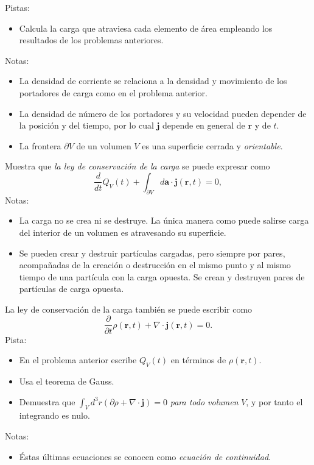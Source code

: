 \documentclass{exam}
\begin{document}
\begin{questions}
    Pistas:
    \begin{itemize}
    \item Calcula la carga que atraviesa cada elemento de área
      empleando los resultados de los problemas anteriores.
    \end{itemize}
    Notas:
    \begin{itemize}
    \item La densidad de corriente se relaciona a la densidad y
      movimiento de los portadores de carga como en el problema
      anterior.
    \item La densidad de número de los portadores y su velocidad pueden
      depender de la posición y del tiempo, por lo cual $\bm j$
      depende en general de $\bm r$ y de $t$.
    \item La frontera $\partial V$ de un volumen $V$ es una superficie
      cerrada y {\em orientable}.
    \end{itemize}
  \question Muestra que {\em la ley de conservación de la carga} se
    puede expresar como
    $$
    \frac{d}{dt}Q_V(t)+\int_{\partial V}d\bm a\cdot\bm j(\bm r,t)=0,
    $$
    Notas:
    \begin{itemize}
    \item La carga no se crea ni se destruye. La única manera como
      puede salirse carga del interior de un volumen es atravesando su
      superficie.
    \item Se pueden crear y destruir partículas cargadas, pero siempre
      por pares, acompañadas de la creación o destrucción en el mismo
      punto y al mismo tiempo de una partícula con la carga
      opuesta. Se crean y destruyen pares de partículas de carga
      opuesta.
    \end{itemize}
  \question La ley de conservación de la carga también se puede
    escribir como
    $$ \frac{\partial}{\partial t}\rho(\bm r,t)+\nabla\cdot\bm j(\bm
    r,t)=0.$$
    Pista:
    \begin{itemize}
    \item En el problema anterior escribe $Q_V(t)$ en términos de
      $\rho(\bm r,t)$.
    \item Usa el teorema de Gauss.
    \item Demuestra que $\int_Vd^3r(\partial\rho+\nabla\cdot\bm j)=0$
      {\em para todo volumen} $V$, y por tanto el integrando es nulo.
    \end{itemize}
    Notas:
    \begin{itemize}
    \item Éstas últimas ecuaciones se conocen como {\em ecuación de
        continuidad}.
    \end{itemize}


\end{questions}
\end{document}
